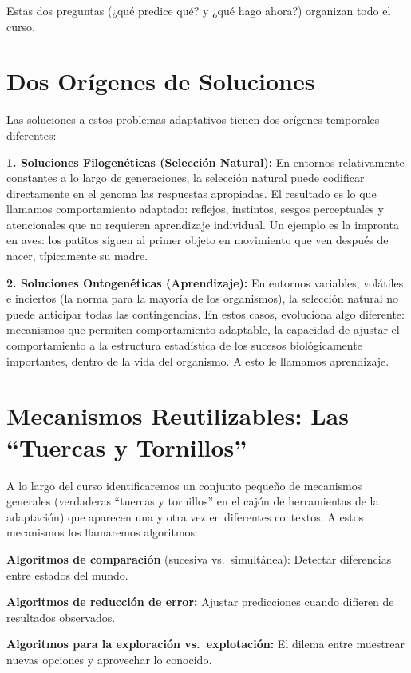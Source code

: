 \documentclass[
  letterpaper,
  DIV=11,
  numbers=noendperiod]{scrreprt}
\begin{document}
Estas dos preguntas (¿qué predice qué? y ¿qué hago ahora?) organizan
todo el curso.

\section{Dos Orígenes de
Soluciones}\label{dos-oruxedgenes-de-soluciones}

Las soluciones a estos problemas adaptativos tienen dos orígenes
temporales diferentes:

\textbf{1. Soluciones Filogenéticas (Selección Natural):} En entornos
relativamente constantes a lo largo de generaciones, la selección
natural puede codificar directamente en el genoma las respuestas
apropiadas. El resultado es lo que llamamos comportamiento adaptado:
reflejos, instintos, sesgos perceptuales y atencionales que no requieren
aprendizaje individual. Un ejemplo es la impronta en aves: los patitos
siguen al primer objeto en movimiento que ven después de nacer,
típicamente su madre.

\textbf{2. Soluciones Ontogenéticas (Aprendizaje):} En entornos
variables, volátiles e inciertos (la norma para la mayoría de los
organismos), la selección natural no puede anticipar todas las
contingencias. En estos casos, evoluciona algo diferente: mecanismos que
permiten comportamiento adaptable, la capacidad de ajustar el
comportamiento a la estructura estadística de los sucesos biológicamente
importantes, dentro de la vida del organismo. A esto le llamamos
aprendizaje.

\section{Mecanismos Reutilizables: Las ``Tuercas y
Tornillos''}\label{mecanismos-reutilizables-las-tuercas-y-tornillos}

A lo largo del curso identificaremos un conjunto pequeño de mecanismos
generales (verdaderas ``tuercas y tornillos'' en el cajón de
herramientas de la adaptación) que aparecen una y otra vez en diferentes
contextos. A estos mecanismos los llamaremos algoritmos:

\textbf{Algoritmos de comparación} (sucesiva vs.~simultánea): Detectar
diferencias entre estados del mundo.

\textbf{Algoritmos de reducción de error:} Ajustar predicciones cuando
difieren de resultados observados.

\textbf{Algoritmos para la exploración vs.~explotación:} El dilema entre
muestrear nuevas opciones y aprovechar lo conocido.
\end{document}
